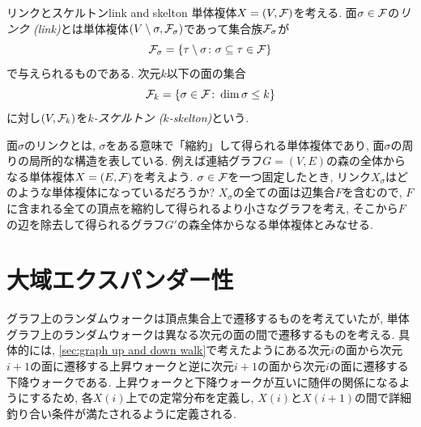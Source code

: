 \begin{definition}{リンクとスケルトン}{link and skelton}
    単体複体$X=(V,\F)$を考える.
    面$\sigma \in \F$の\emph{リンク (link)}とは単体複体$(V\setminus \sigma, \F_{\sigma})$であって集合族$\F_\sigma$が
    \[
        \F_\sigma = \cbra*{ \tau \setminus \sigma \colon \sigma \subseteq \tau \in \F }
    \]
    で与えられるものである.
    次元$k$以下の面の集合
    \[
        \F_k = \cbra*{ \sigma \in \F \colon \dim \sigma \le k}
    \]
    に対し$(V,\F_k)$を\emph{$k$-スケルトン ($k$-skelton)}という.
\end{definition}
面$\sigma$のリンクとは, $\sigma$をある意味で「縮約」して得られる単体複体であり, 面$\sigma$の周りの局所的な構造を表している.
例えば連結グラフ$G=(V,E)$の森の全体からなる単体複体$X=(E,\F)$を考えよう.
$\sigma\in \F$を一つ固定したとき, リンク$X_\sigma$はどのような単体複体になっているだろうか?
$X_\sigma$の全ての面は辺集合$F$を含むので, $F$に含まれる全ての頂点を縮約して得られるより小さなグラフを考え, そこから$F$の辺を除去して得られるグラフ$G'$の森全体からなる単体複体とみなせる.

\section{大域エクスパンダー性}
グラフ上のランダムウォークは頂点集合上で遷移するものを考えていたが,
単体グラフ上のランダムウォークは異なる次元の面の間で遷移するものを考える.
具体的には, \cref{sec:graph up and down walk}で考えたようにある次元$i$の面から次元$i+1$の面に遷移する上昇ウォークと逆に次元$i+1$の面から次元$i$の面に遷移する下降ウォークである.
上昇ウォークと下降ウォークが互いに随伴の関係になるようにするため, 各$X(i)$上での定常分布を定義し, $X(i)$と$X(i+1)$の間で詳細釣り合い条件が満たされるように定義される.


